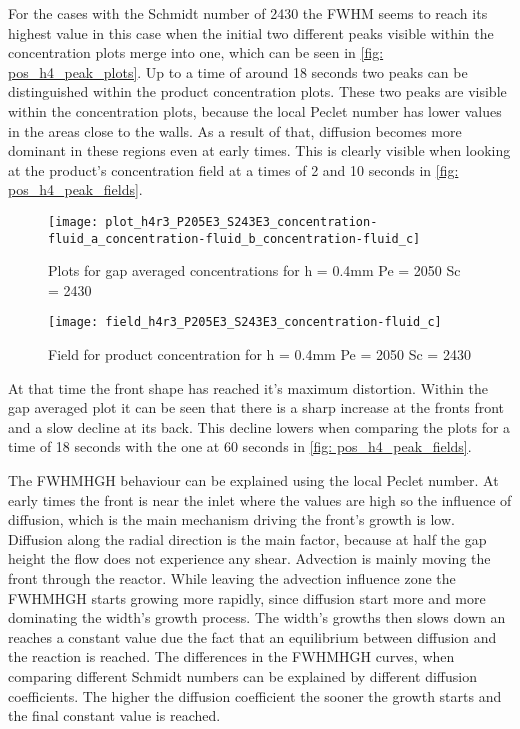\documentclass[../thesis.tex]{subfiles}
\begin{document}
For the cases with the Schmidt number of 2430 the FWHM seems to reach its highest value in this case when the initial two different peaks visible within the concentration plots merge into one, which can be seen in \autoref{fig: pos_h4_peak_plots}. Up to a time of around 18 seconds two peaks can be distinguished within the product concentration plots. These two peaks are visible within the concentration plots, because the local Peclet number has lower values in the areas close to the walls. As a result of that, diffusion becomes more dominant in these regions even at early times. This is clearly visible when looking at the product's concentration field at a times of 2 and 10 seconds in \autoref{fig: pos_h4_peak_fields}.

\begin{figure}[htbp]
	\centering
	\texttt{[image: plot\_h4r3\_P205E3\_S243E3\_concentration-fluid\_a\_concentration-fluid\_b\_concentration-fluid\_c]}
	\caption{Plots for gap averaged concentrations for h = 0.4mm Pe = 2050 Sc = 2430}
	\label{fig: pos_h4_peak_plots}
\end{figure}
\begin{figure}[htbp]
	\centering
	\texttt{[image: field\_h4r3\_P205E3\_S243E3\_concentration-fluid\_c]}
	\caption{Field for product concentration for h = 0.4mm Pe = 2050 Sc = 2430}
	\label{fig: pos_h4_peak_fields}
\end{figure}

At that time the front shape has reached it's maximum distortion. Within the gap averaged plot it can be seen that there is a sharp increase at the fronts front and a slow decline at its back. This decline lowers when comparing the plots for a time of 18 seconds with the one at 60 seconds in \autoref{fig: pos_h4_peak_fields}.

The FWHMHGH behaviour can be explained using the local Peclet number. At early times the front is near the inlet where the values are high so the influence of diffusion, which is the main mechanism driving the front's growth is low. Diffusion along the radial direction is the main factor, because at half the gap height the flow does not experience any shear. Advection is mainly moving the front through the reactor. While leaving the advection influence zone the FWHMHGH starts growing more rapidly, since diffusion start more and more dominating the width's growth process. The width's growths then slows down an reaches a constant value due the fact that an equilibrium between diffusion and the reaction is reached. The differences in the FWHMHGH curves, when comparing different Schmidt numbers can be explained by different diffusion coefficients. The higher the diffusion coefficient the sooner the growth starts and the final constant value is reached.
\newline
\end{document}
